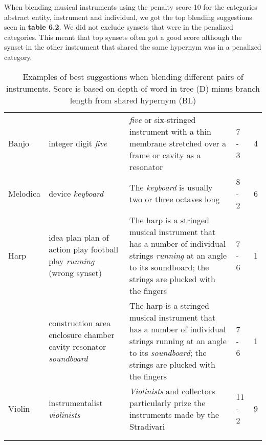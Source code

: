 When blending musical instruments using the penalty score 10 for the categories abstract entity, instrument and individual, we got the top blending suggestions seen in \textbf{table 6.2}. We did not exclude synsets that were in the penalized categories. This meant that top synsets often got a good score although the synset in the other instrument that shared the same hypernym was in a penalized category.
\begin{table}
	\caption{Examples of best suggestions when blending different pairs of instruments. Score is based on depth of word in tree (D) minus branch length from shared hypernym (BL)}
	\label{tab:topscoringexamples}
	\centering
	\begin{tabular}{l p{30mm} p{30mm} l l}
		\toprule
		\tabhead{Instrument} & \tabhead{Top scoring branch} & \tabhead{Context} & \tabhead{D - BL} & \tabhead{Score} \\
		\midrule
		Banjo &
		integer \newline
		digit \newline
		\emph{five} & \emph{five} or six-stringed instrument with a thin membrane stretched over a frame or cavity as a resonator & 7 - 3 & 4	\\
		Melodica &
		device \newline 
		\emph{keyboard} &
		The \emph{keyboard} is usually two or three octaves long & 8 - 2 &	6
		\\
		\midrule
		Harp &
		idea \newline
		plan \newline
		plan of action \newline
		play \newline
		football play \newline
		\emph{running} \newline
		(wrong synset) & The harp is a stringed musical instrument that has a number of individual strings \emph{running} at an angle to its soundboard; the strings are plucked with the fingers & 7 - 6 & 1	\\
		 &
		construction \newline
		area \newline
		enclosure \newline
		chamber \newline
		cavity resonator \newline
		\emph{soundboard} &
		The harp is a stringed musical instrument that has a number of individual strings running at an angle to its \emph{soundboard}; the strings are plucked with the fingers & 7 - 6 &	1 \\
		Violin &
		instrumentalist \newline
		\emph{violinists} & \emph{Violinists} and collectors particularly prize the instruments made by the Stradivari & 11 - 2 & 9	\\
		\\
		\bottomrule\\
	\end{tabular}
\end{table}

